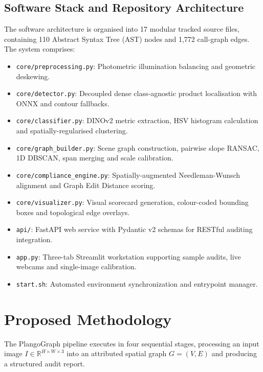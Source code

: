 \documentclass[conference]{IEEEtran}
\begin{document}
\subsection{Software Stack and Repository Architecture}
The software architecture is organised into 17 modular tracked source files, containing 110 Abstract Syntax Tree (AST) nodes and 1,772 call-graph edges. The system comprises:
\begin{itemize}
    \item \texttt{core/preprocessing.py}: Photometric illumination balancing and geometric deskewing.
    \item \texttt{core/detector.py}: Decoupled dense class-agnostic product localisation with ONNX and contour fallbacks.
    \item \texttt{core/classifier.py}: DINOv2 metric extraction, HSV histogram calculation and spatially-regularised clustering.
    \item \texttt{core/graph_builder.py}: Scene graph construction, pairwise slope RANSAC, 1D DBSCAN, span merging and scale calibration.
    \item \texttt{core/compliance_engine.py}: Spatially-augmented Needleman-Wunsch alignment and Graph Edit Distance scoring.
    \item \texttt{core/visualizer.py}: Visual scorecard generation, colour-coded bounding boxes and topological edge overlays.
    \item \texttt{api/}: FastAPI web service with Pydantic v2 schemas for RESTful auditing integration.
    \item \texttt{app.py}: Three-tab Streamlit workstation supporting sample audits, live webcams and single-image calibration.
    \item \texttt{start.sh}: Automated environment synchronization and entrypoint manager.
\end{itemize}

\section{Proposed Methodology}
The PlangoGraph pipeline executes in four sequential stages, processing an input image $I \in \mathbb{R}^{H \times W \times 3}$ into an attributed spatial graph $G = (V, E)$ and producing a structured audit report.
\end{document}
